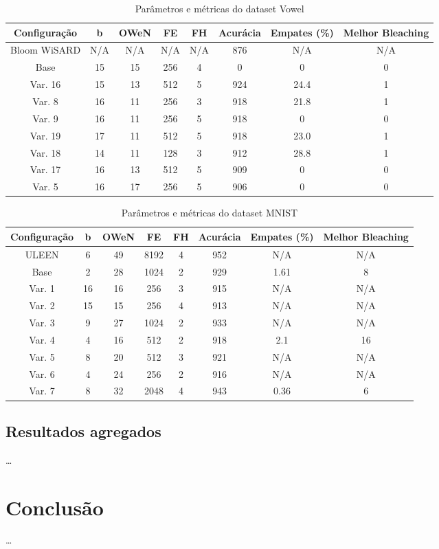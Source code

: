 \documentclass{article}
\begin{document}
{\begin{table}[h!]
\caption{Parâmetros e métricas do dataset Vowel}
\begin{tabular}{|c|c|c|c|c|c|c|c|}
\hline
\textbf{Configuração} & \textbf{b} & \textbf{OWeN} & \textbf{FE} & \textbf{FH} & \textbf{Acurácia} & \textbf{Empates (\%)} & \textbf{Melhor Bleaching} \\
\hline
Bloom WiSARD & N/A & N/A & N/A & N/A & 876 & N/A & N/A \\
\hline
Base & 15 & 15 & 256 & 4 & 0 & 0 & 0 \\
\hline
Var. 16 & 15 & 13 & 512 & 5 & 924 & 24.4 & 1 \\
\hline
Var. 8 & 16 & 11 & 256 & 3 & 918 & 21.8 & 1 \\
\hline
Var. 9 & 16 & 11 & 256 & 5 & 918 & 0 & 0 \\
\hline
Var. 19 & 17 & 11 & 512 & 5 & 918 & 23.0 & 1 \\
\hline
Var. 18 & 14 & 11 & 128 & 3 & 912 & 28.8 & 1 \\
\hline
Var. 17 & 16 & 13 & 512 & 5 & 909 & 0 & 0 \\
\hline
Var. 5 & 16 & 17 & 256 & 5 & 906 & 0 & 0 \\
\hline
\end{tabular}
\end{table}

\begin{table}[h!]
\caption{Parâmetros e métricas do dataset MNIST}
\begin{tabular}{|c|c|c|c|c|c|c|c|}
\hline
\textbf{Configuração} & \textbf{b} & \textbf{OWeN} & \textbf{FE} & \textbf{FH} & \textbf{Acurácia} & \textbf{Empates (\%)} & \textbf{Melhor Bleaching} \\
\hline
ULEEN & 6 & 49 & 8192 & 4 & 952 & N/A & N/A \\
\hline
Base & 2 & 28 & 1024 & 2 & 929 & 1.61 & 8 \\
\hline
Var. 1 & 16 & 16 & 256 & 3 & 915 & N/A & N/A \\
\hline
Var. 2 & 15 & 15 & 256 & 4 & 913 & N/A & N/A \\
\hline
Var. 3 & 9 & 27 & 1024 & 2 & 933 & N/A & N/A \\
\hline
Var. 4 & 4 & 16 & 512 & 2 & 918 & 2.1 & 16 \\
\hline
Var. 5 & 8 & 20 & 512 & 3 & 921 & N/A & N/A \\
\hline
Var. 6 & 4 & 24 & 256 & 2 & 916 & N/A & N/A \\
\hline
Var. 7 & 8 & 32 & 2048 & 4 & 943 & 0.36 & 6 \\
\hline
\end{tabular}
\end{table}
}

\subsection{Resultados agregados}

\ldots

\section{Conclusão}

\ldots



\end{document}
